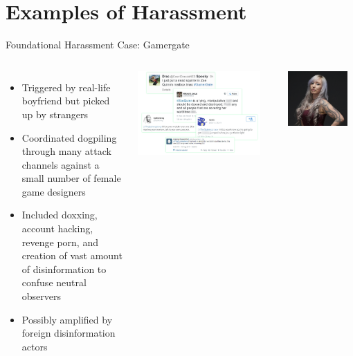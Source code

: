 \documentclass[nobackground,dvipsnames,table,aspectratio=169]{beamer}
\begin{document}
\section{Examples of Harassment}

\begin{frame}{Foundational Harassment Case: Gamergate}
    \begin{columns}
            \begin{itemize}
                \item Triggered by real-life boyfriend but picked up by strangers
                \item Coordinated dogpiling through many attack channels against a small number of female game designers
                \item Included doxxing, account hacking, revenge porn, and creation of vast amount of disinformation to confuse neutral observers
                \item Possibly amplified by foreign disinformation actors
            \end{itemize}
            \includegraphics[width=0.9\textwidth]{zoe-quinn-harassment-tweets}
            \begin{columns}
                    \includegraphics[width=0.9\textwidth]{zoe-quinn}

\end{columns}
\end{columns}
\end{frame}
\end{document}
